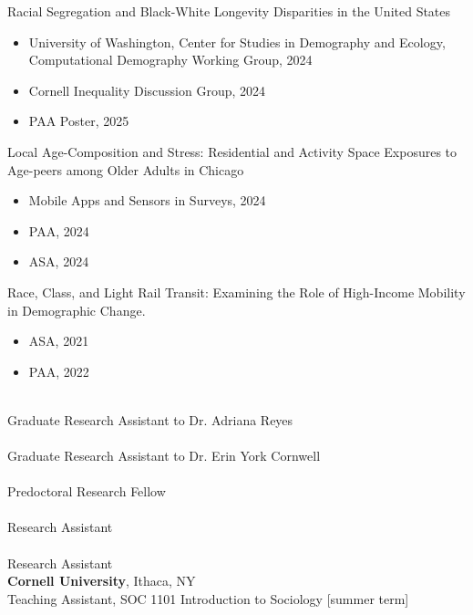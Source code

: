 \documentclass[11pt]{article} %
\begin{document}
Racial Segregation and Black-White Longevity Disparities in the United States 
\begin{itemize}
\item  University of Washington, Center for Studies in Demography and Ecology, Computational Demography Working Group, 2024
\item Cornell Inequality Discussion Group, 2024
\item PAA Poster, 2025
\end{itemize}
Local Age-Composition and Stress: Residential and Activity Space Exposures to Age-peers among Older Adults in Chicago
\begin{itemize}
\item Mobile Apps and Sensors in Surveys, 2024
\item PAA, 2024 
\item ASA, 2024
\end{itemize}
Race, Class, and Light Rail Transit: Examining the Role of High-Income Mobility in Demographic Change. 
\begin{itemize}
\item ASA, 2021
\item PAA, 2022
\end{itemize}
 \\ 
Graduate Research Assistant to Dr. Adriana Reyes \\
 \\ 
Graduate Research Assistant to Dr. Erin York Cornwell \\  
 \\ Predoctoral Research Fellow \\
 \\ Research Assistant \\ 
 \\ Research Assistant \\ 

\textbf{Cornell University}, Ithaca, NY \\
 Teaching Assistant, SOC 1101 Introduction to Sociology [summer term] \\
\end{document}
